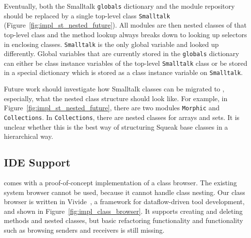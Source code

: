 Eventually, both the Smalltalk \texttt{globals} dictionary and the module repository should be replaced by a single top-level class \texttt{Smalltalk} (Figure~\ref{fig:impl_st_nested_future}). All modules are then nested classes of that top-level class and the method lookup always breaks down to looking up selectors in enclosing classes. \texttt{Smalltalk} is the only global variable and looked up differently. Global variables that are currently stored in the \texttt{globals} dictionary can either be class instance variables of the top-level \texttt{Smalltalk} class or be stored in a special dictionary which is stored as a class instance variable on \texttt{Smalltalk}.

Future work should investigate how Smalltalk classes can be migrated to \msname, especially, what the nested class structure should look like. For example, in Figure~\ref{fig:impl_st_nested_future}, there are two modules \texttt{Morphic} and \texttt{Collections}. In \texttt{Collections}, there are nested classes for arrays and sets. It is unclear whether this is the best way of structuring Squeak base classes in a hierarchical way.


\subsection{IDE Support}
\msname comes with a proof-of-concept implementation of a class browser. The existing system browser cannot be used, because it cannot handle class nesting. Our class browser is written in Vivide~\cite{Taeumel:2012:VPE:2384592.2384604}, a framework for dataflow-driven tool development, and shown in Figure~\ref{fig:impl_class_browser}. It supports creating and deleting methods and nested classes, but basic refactoring functionality and functionality such as browsing senders and receivers is still missing.


